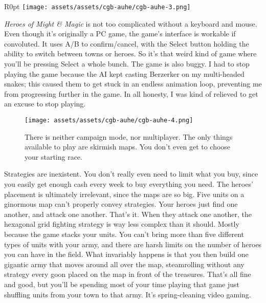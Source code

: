 \documentclass{book}
\begin{document}
\begin{wrapfigure}{R}{0pt} \texttt{[image: assets/assets/cgb-auhe/cgb-auhe-3.png]}\end{wrapfigure}
\emph{Heroes of Might \& Magic} is not too complicated without a keyboard and mouse. Even though it’s originally a PC game, the game’s interface is workable if convoluted. It uses A/B to confirm/cancel, with the Select button holding the ability to switch between towns or heroes. So it’s that weird kind of game where you’ll be pressing Select a whole bunch. The game is also buggy. I had to stop playing the game because the AI kept casting Berzerker on my multi-headed snakes; this caused them to get stuck in an endless animation loop, preventing me from progressing further in the game. In all honesty, I was kind of relieved to get an excuse to stop playing.

\begin{figure}[hbt]
\vskip 10pt
\centering \texttt{[image: assets/assets/cgb-auhe/cgb-auhe-4.png]}\par\pagetwodescription There is neither campaign mode, nor multiplayer. The only things available to play are skirmish maps. You don’t even get to choose your starting race.
\vskip 6pt
\end{figure}

Strategies are inexistent. You don’t really even need to limit what you buy, since you easily get enough cash every week to buy everything you need. The heroes’ placement is ultimately irrelevant, since the maps are so big. Five units on a ginormous map can’t properly convey strategies. Your heroes just find one another, and attack one another. That’s it. When they attack one another, the hexagonal grid fighting strategy is way less complex than it should. Mostly because the game stacks your units. You can’t bring more than five different types of units with your army, and there are harsh limits on the number of heroes you can have in the field. What invariably happens is that you then build one gigantic army that moves around all over the map, steamrolling without any strategy every goon placed on the map in front of the treasures. That’s all fine and good, but you’ll be spending most of your time playing that game just shuffling units from your town to that army. It’s spring-cleaning video gaming.
\end{document}

